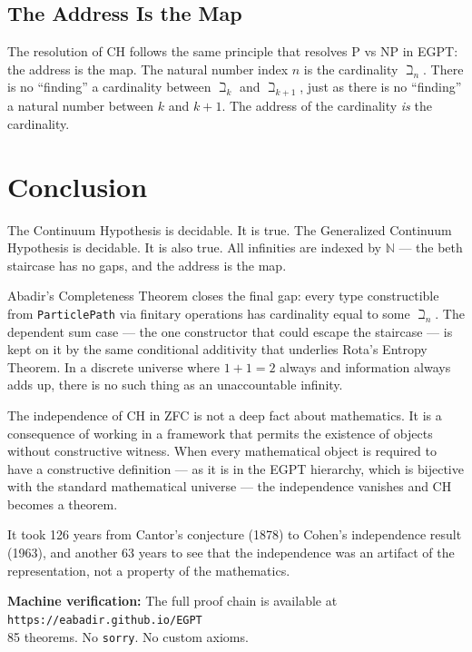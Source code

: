 \documentclass{report}
\begin{document}
\subsection{The Address Is the Map}
The resolution of CH follows the same principle that resolves P vs NP in EGPT:
the address is the map. The natural number index $n$ is the cardinality
$\beth_n$. There is no ``finding'' a cardinality between $\beth_k$ and
$\beth_{k+1}$, just as there is no ``finding'' a natural number between $k$
and $k + 1$. The address of the cardinality \emph{is} the cardinality.

\section{Conclusion}

The Continuum Hypothesis is decidable. It is true. The Generalized Continuum
Hypothesis is decidable. It is also true. All infinities are indexed by
$\mathbb{N}$ --- the beth staircase has no gaps, and the address is the map.

Abadir's Completeness Theorem closes the final gap: every type constructible
from \texttt{ParticlePath} via finitary operations has cardinality equal to
some $\beth_n$. The dependent sum case --- the one constructor that could
escape the staircase --- is kept on it by the same conditional additivity
that underlies Rota's Entropy Theorem. In a discrete universe where $1 + 1 = 2$
always and information always adds up, there is no such thing as an
unaccountable infinity.

The independence of CH in ZFC is not a deep fact about mathematics. It is a
consequence of working in a framework that permits the existence of objects
without constructive witness. When every mathematical object is required to have
a constructive definition --- as it is in the EGPT hierarchy, which is bijective
with the standard mathematical universe --- the independence vanishes and CH
becomes a theorem.

It took 126 years from Cantor's conjecture (1878) to Cohen's independence result
(1963), and another 63 years to see that the independence was an artifact of the
representation, not a property of the mathematics.

\vspace{1cm}

\noindent\textbf{Machine verification:} The full proof chain is available at\\
\texttt{https://eabadir.github.io/EGPT}\\
85 theorems. No \texttt{sorry}. No custom axioms.
\end{document}
